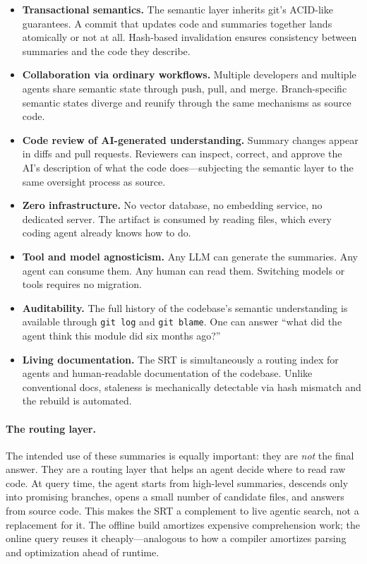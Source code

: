 \documentclass[11pt,a4paper]{article}
\newcommand{\srt}{\textsc{SRT}}
\begin{document}
\begin{itemize}[nosep]
    \item \textbf{Transactional semantics.} The semantic layer inherits git's ACID-like guarantees. A commit that updates code and summaries together lands atomically or not at all. Hash-based invalidation ensures consistency between summaries and the code they describe.
    \item \textbf{Collaboration via ordinary workflows.} Multiple developers and multiple agents share semantic state through push, pull, and merge. Branch-specific semantic states diverge and reunify through the same mechanisms as source code.
    \item \textbf{Code review of AI-generated understanding.} Summary changes appear in diffs and pull requests. Reviewers can inspect, correct, and approve the AI's description of what the code does---subjecting the semantic layer to the same oversight process as source.
    \item \textbf{Zero infrastructure.} No vector database, no embedding service, no dedicated server. The artifact is consumed by reading files, which every coding agent already knows how to do.
    \item \textbf{Tool and model agnosticism.} Any LLM can generate the summaries. Any agent can consume them. Any human can read them. Switching models or tools requires no migration.
    \item \textbf{Auditability.} The full history of the codebase's semantic understanding is available through \texttt{git log} and \texttt{git blame}. One can answer ``what did the agent think this module did six months ago?''
    \item \textbf{Living documentation.} The \srt{} is simultaneously a routing index for agents and human-readable documentation of the codebase. Unlike conventional docs, staleness is mechanically detectable via hash mismatch and the rebuild is automated.
\end{itemize}

\paragraph{The routing layer.}
The intended use of these summaries is equally important: they are \emph{not} the final answer.
They are a routing layer that helps an agent decide where to read raw code.
At query time, the agent starts from high-level summaries, descends only into promising branches, opens a small number of candidate files, and answers from source code.
This makes the \srt{} a complement to live agentic search, not a replacement for it.
The offline build amortizes expensive comprehension work; the online query reuses it cheaply---analogous to how a compiler amortizes parsing and optimization ahead of runtime.
\end{document}

